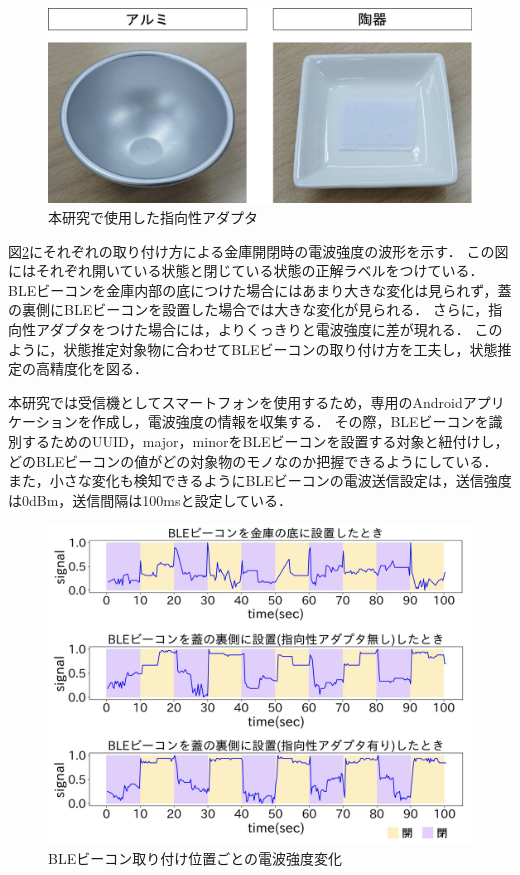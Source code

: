 \begin{figure}[H]
    \centering
    \includegraphics[width=12cm]{images/chapter3/adapta.jpg}
    \caption{本研究で使用した指向性アダプタ}
    \label{adapter_only}
\end{figure}


図\ref{transform-data}にそれぞれの取り付け方による金庫開閉時の電波強度の波形を示す．
この図にはそれぞれ開いている状態と閉じている状態の正解ラベルをつけている．
BLEビーコンを金庫内部の底につけた場合にはあまり大きな変化は見られず，蓋の裏側にBLEビーコンを設置した場合では大きな変化が見られる．
さらに，指向性アダプタをつけた場合には，よりくっきりと電波強度に差が現れる．
このように，状態推定対象物に合わせてBLEビーコンの取り付け方を工夫し，状態推定の高精度化を図る．

本研究では受信機としてスマートフォンを使用するため，専用のAndroidアプリケーションを作成し，電波強度の情報を収集する．
その際，BLEビーコンを識別するためのUUID，major，minorをBLEビーコンを設置する対象と紐付けし，どのBLEビーコンの値がどの対象物のモノなのか把握できるようにしている．
また，小さな変化も検知できるようにBLEビーコンの電波送信設定は，送信強度は0dBm，送信間隔は100msと設定している．

\begin{figure}[H]
    \centering
    \includegraphics[width=14cm]{images/chapter3/in-out.jpg}
    \caption{BLEビーコン取り付け位置ごとの電波強度変化}
    \label{transform-data}
\end{figure}


